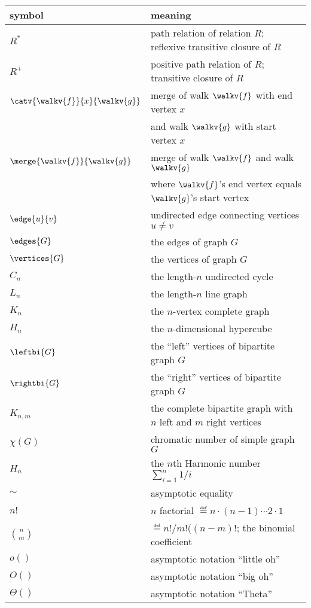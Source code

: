 \begin{center}
\begin{tabular}{ll}
symbol         &  meaning\\
\hline
$R^*$          & path relation of relation $R$; reflexive transitive closure of $R$\\
$R^+$          & positive path relation of $R$; transitive closure of $R$\\
$\catv{\walkv{f}}{x}{\walkv{g}}$   & merge of walk $\walkv{f}$ with end vertex $x$\\
                                   & and walk $\walkv{g}$ with start vertex $x$\\
$\merge{\walkv{f}}{\walkv{g}}$      & merge of walk $\walkv{f}$ and walk $\walkv{g}$\\
                                   & where $\walkv{f}$'s end vertex equals $\walkv{g}$'s start vertex\\
$\edge{u}{v}$  & undirected edge connecting vertices $u \neq v$\\
$\edges{G}$    & the edges of graph $G$\\
$\vertices{G}$ & the vertices of graph $G$\\
$C_n$          & the length-$n$ undirected cycle\\
$L_n$          & the length-$n$ line graph\\
$K_n$          & the $n$-vertex complete graph\\
$H_n$          & the $n$-dimensional hypercube\\
$\leftbi{G}$   & the ``left'' vertices of bipartite graph $G$\\
$\rightbi{G}$  & the ``right'' vertices of bipartite graph $G$\\
$K_{n,m}$       & the complete bipartite graph with $n$ left and $m$ right vertices\\
$\chi(G)$      & chromatic number of simple graph $G$\\
$H_n$          & the $n$th Harmonic number $\sum_{i=1}^n 1/i$\\
$\sim$         & asymptotic equality\\
$n!$           & $n$ factorial $\eqdef n \cdot (n-1) \cdots 2 \cdot 1$\\
$\binom{n}{m}$ & $\eqdef n!/m!((n-m)!$; the binomial coefficient\\
$o()$          & asymptotic notation ``little oh''\\
$O()$          & asymptotic notation ``big oh''\\
$\Theta()$     & asymptotic notation ``Theta''\\

\end{tabular}
\end{center}
